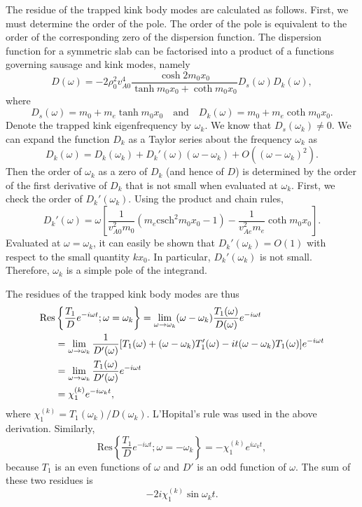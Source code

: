 \documentclass[12pt]{../style-files/ociamthesis}
\begin{document}
The residue of the trapped kink body modes are calculated as follows. First, we must determine the order of the pole. The order of the pole is equivalent to the order of the corresponding zero of the dispersion function. The dispersion function for a symmetric slab can be factorised into a product of a functions governing sausage and kink modes, namely
\begin{equation}
D(\omega) = -2\rho_0^2v_{A0}^4 \frac{\cosh{2m_0x_0}}{\tanh{m_0x_0} + \coth{m_0x_0}} D_s(\omega) D_k(\omega),
\end{equation}
where
\begin{equation}
D_s(\omega) = m_0 + m_e\tanh{m_0x_0} \quad \text{and} \quad D_k(\omega) = m_0 + m_e\coth{m_0x_0}.
\end{equation}
Denote the trapped kink eigenfrequency by $\omega_k$. We know that $D_s(\omega_k) \neq 0$. We can expand the function $D_k$ as a Taylor series about the frequency $\omega_k$ as
\begin{equation}
D_k(\omega) = D_k(\omega_k) + D_k'(\omega)(\omega - \omega_k) + O((\omega - \omega_k)^2).
\end{equation}
Then the order of $\omega_k$ as a zero of $D_k$ (and hence of $D$) is determined by the order of the first derivative of $D_k$ that is not small when evaluated at $\omega_k$. First, we check the order of $D_k'(\omega_k)$. Using the product and chain rules,
\begin{equation}
D_k'(\omega) = \omega\left[ \frac{1}{v_{A0}^2m_0} (m_e\text{csch}^2{m_0x_0} - 1) - \frac{1}{v_{Ae}^2m_e}\coth{m_0x_0} \right].
\end{equation}
Evaluated at $\omega = \omega_k$, it can easily be shown that $D_k'(\omega_k) = O(1)$ with respect to the small quantity $kx_0$. In particular, $D_k'(\omega_k)$ is not small. Therefore, $\omega_k$ is a simple pole of the integrand.

The residues of the trapped kink body modes are thus
\begin{align}
\text{Res}&\left\{ \frac{T_1}{D} e^{-i\omega t} ; \omega = \omega_k \right\} = \lim_{\omega \to \omega_k} (\omega - \omega_k)\frac{T_1(\omega)}{D(\omega)} e^{-i\omega t} \notag \\
&= \lim_{\omega \to \omega_k}\frac{1}{D'(\omega)} [T_1(\omega) + (\omega - \omega_k)T_1'(\omega) - it(\omega - \omega_k)T_1(\omega)]e^{-i\omega t} \notag \\
&= \lim_{\omega \to \omega_k} \frac{T_1(\omega)}{D'(\omega)}e^{-i\omega t} \notag \\
&= \chi_1^{(k)} e^{-i\omega_k t},
\end{align}
where $\chi_1^{(k)} = T_1(\omega_k)/D(\omega_k)$. L'Hopital's rule was used in the above derivation. Similarly, 
\begin{equation}
\text{Res}\left\{ \frac{T_1}{D} e^{-i\omega t} ; \omega = -\omega_k \right\} = -\chi_1^{(k)} e^{i\omega_k t},
\end{equation}
because $T_1$ is an even functions of $\omega$ and $D'$ is an odd function of $\omega$. The sum of these two residues is
\begin{equation}
-2i\chi_1^{(k)}\sin{\omega_k t}.
\end{equation}
\end{document}
